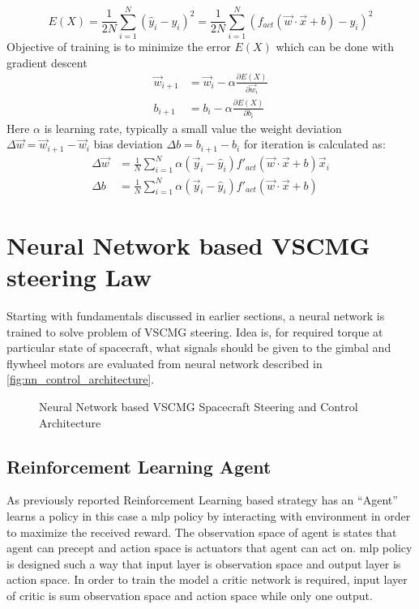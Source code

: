 \begin{equation}
E( X) =\frac{1}{2N}\sum ^{N}_{i=1}(\hat{y}_{i} -y_{i})^{2} =\frac{1}{2N}\sum ^{N}_{i=1}( f_{act}(\vec{w} \cdotp \vec{x} +b) -y_{i})^{2}
\end{equation}Objective of training is to minimize the error $\displaystyle E( X)$ which can be done with gradient descent
\begin{equation}
\begin{aligned}
\vec{w}_{i+1} & =\vec{w}_{i} -\alpha \frac{\partial E( X)}{\partial \vec{w}_{i}}\\
b_{i+1} & =b_{i} -\alpha \frac{\partial E( X)}{\partial b_{i}}
\end{aligned}
\end{equation}
Here $\displaystyle \alpha $ is learning rate, typically a small value the weight deviation $\displaystyle \Delta \vec{w} =\vec{w}_{i+1} -\vec{w}_{i}$ bias deviation $\displaystyle \Delta b=b_{i+1} -b_{i}$ for iteration is calculated as:
\begin{equation}
\begin{aligned}
\Delta \vec{w} & =\frac{1}{N}\sum ^{N}_{i=1} \alpha (\vec{y}_{i} -\hat{y}_{i}) f'_{act}(\vec{w} \cdotp \vec{x} +b)\vec{x}_{i}\\
\Delta b & =\frac{1}{N}\sum ^{N}_{i=1} \alpha (\vec{y}_{i} -\hat{y}_{i}) f'_{act}(\vec{w} \cdotp \vec{x} +b)
\end{aligned}
\end{equation}
\section{Neural Network based VSCMG steering Law}
Starting with fundamentals discussed in earlier sections, a neural network is trained to solve problem of VSCMG steering. Idea is, for required torque at particular state of spacecraft, what signals should be given to the gimbal and flywheel motors are evaluated from neural network described in \autoref{fig:nn_control_architecture}. 

\begin{figure}[H]
    \centering
    
    \caption{Neural Network based VSCMG Spacecraft Steering and Control Architecture}
    \label{fig:nn_control_architecture}
\end{figure}
\subsection{Reinforcement Learning Agent}
As previously reported Reinforcement Learning based strategy has an ``Agent'' learns a policy in this case a \acrshort{mlp} policy by interacting with environment in order to maximize the received reward. The observation space of agent is states that agent can precept and action space is actuators that agent can act on. \acrshort{mlp} policy is designed such a way that input layer is observation space and output layer is action space. In order to train the model a critic network is required, input layer of critic is sum observation space and action space while only one output.
